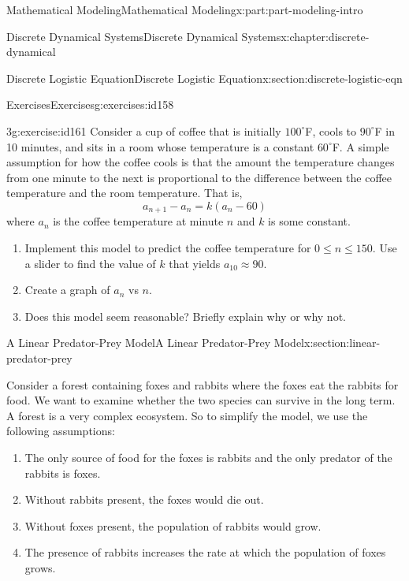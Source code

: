 \documentclass[oneside,10pt,]{book}
\numberwithin{equation}{section}
\begin{document}
\begin{partptx}{Mathematical Modeling}{}{Mathematical Modeling}{}{}{x:part:part-modeling-intro}
\begin{chapterptx}{Discrete Dynamical Systems}{}{Discrete Dynamical Systems}{}{}{x:chapter:discrete-dynamical}
\begin{sectionptx}{Discrete Logistic Equation}{}{Discrete Logistic Equation}{}{}{x:section:discrete-logistic-eqn}
\begin{exercises-subsection-numberless}{Exercises}{}{Exercises}{}{}{g:exercises:id158}
\begin{divisionexercise}{3}{}{}{g:exercise:id161}%
Consider a cup of coffee that is initially \(100^\circ\)F, cools to \(90^\circ\)F in 10 minutes, and sits in a room whose temperature is a constant \(60^\circ\)F. A simple assumption for how the coffee cools is that the amount the temperature changes from one minute to the next is proportional to the difference between the coffee temperature and the room temperature.%
 That is,%
\begin{equation*}
a_{n+1} - a_{n} = k (a_n - 60)
\end{equation*}
where \(a_n\) is the coffee temperature at minute \(n\) and \(k\) is some constant.\begin{enumerate}[font=\bfseries,label=(\alph*),ref=\alph*]
\item{}Implement this model to predict the coffee temperature for \(0\le n\le 150\). Use a slider to find the value of \(k\) that yields \(a_{10} \approx 90\).%
\item{}Create a graph of \(a_n\) vs \(n\).%
\item{}Does this model seem reasonable? Briefly explain why or why not.%
\end{enumerate}
\end{divisionexercise}%
\end{exercises-subsection-numberless}
\end{sectionptx}
%
%
\typeout{************************************************}
\typeout{************************************************}
%
\begin{sectionptx}{A Linear Predator-Prey Model}{}{A Linear Predator-Prey Model}{}{}{x:section:linear-predator-prey}
\begin{introduction}{}%
Consider a forest containing foxes and rabbits where the foxes eat the rabbits for food. We want to examine whether the two species can survive in the long term.  A forest is a very complex ecosystem.  So to simplify the model, we use the following assumptions:%
%
\begin{enumerate}
\item{}The only source of food for the foxes is rabbits and the only predator of the rabbits is foxes.%
\item{}Without rabbits present, the foxes would die out.%
\item{}Without foxes present, the population of rabbits would grow.%
\item{}The presence of rabbits increases the rate at which the population of foxes grows.%

\end{enumerate}
\end{introduction}
\end{sectionptx}
\end{chapterptx}
\end{partptx}
\end{document}
